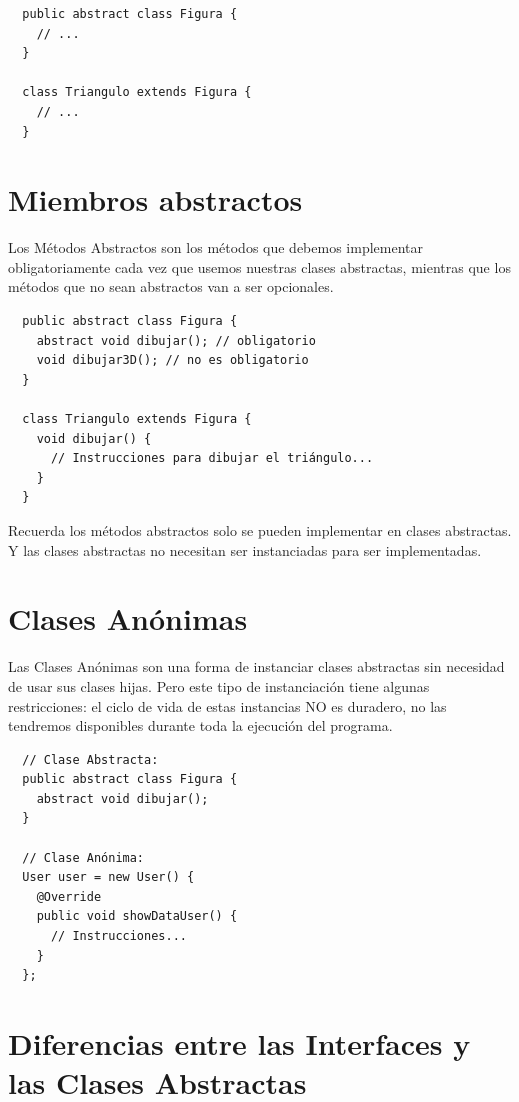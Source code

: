 \documentclass{article}
\begin{document}
\begin{verbatim}
  public abstract class Figura {
    // ...
  }

  class Triangulo extends Figura {
    // ...
  }
\end{verbatim}


\section{Miembros abstractos}%
Los Métodos Abstractos son los métodos que debemos implementar obligatoriamente
cada vez que usemos nuestras clases abstractas, mientras que los métodos que no
sean abstractos van a ser opcionales.\\

\begin{verbatim}
  public abstract class Figura {
    abstract void dibujar(); // obligatorio
    void dibujar3D(); // no es obligatorio
  }

  class Triangulo extends Figura {
    void dibujar() {
      // Instrucciones para dibujar el triángulo...
    }
  }
\end{verbatim}

Recuerda los métodos abstractos solo se pueden implementar en clases
abstractas. Y las clases abstractas no necesitan ser instanciadas para ser
implementadas.\\

\section{Clases Anónimas}%
Las Clases Anónimas son una forma de instanciar clases abstractas sin necesidad
de usar sus clases hijas. Pero este tipo de instanciación tiene algunas
restricciones: el ciclo de vida de estas instancias NO es duradero, no las
tendremos disponibles durante toda la ejecución del programa.

\begin{verbatim}
  // Clase Abstracta:
  public abstract class Figura {
    abstract void dibujar();
  }

  // Clase Anónima:
  User user = new User() {
    @Override
    public void showDataUser() {
      // Instrucciones...
    }
  };
\end{verbatim}


\section{Diferencias entre las Interfaces y las Clases Abstractas}%
\end{document}
